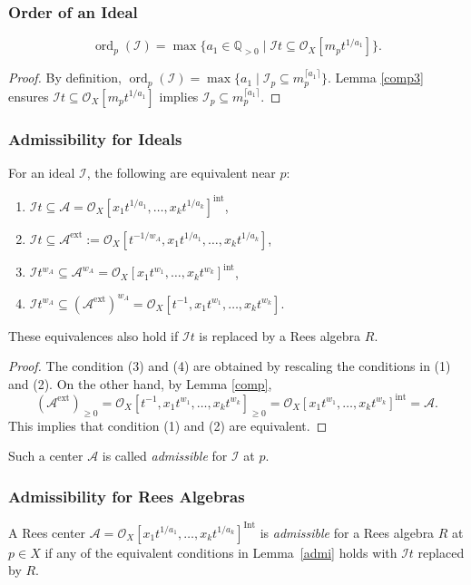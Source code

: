 \documentclass{amsart}
\newcommand{\QQ}{{\mathbb{Q}}}
\newcommand{\cA}{{\mathcal A}}
\newcommand{\cI}{{\mathcal I}}
\newcommand{\cO}{{\mathcal O}}
\newcommand{\Int}{{\operatorname{Int}}}
\newcommand{\ext}{{\operatorname{ext}}}
\newcommand{\ord}{{\operatorname{ord}}}
\newcommand{\inte}{{\operatorname{int}}}
\begin{document}
\subsubsection{Order of an Ideal}
\begin{lemma}\label{order3}
\[ \ord_p(\cI) = \max \{ a_1 \in \QQ_{>0} \mid \cI t \subseteq \cO_X[m_pt^{1/a_1}] \}. \]
\end{lemma}
\begin{proof}
By definition, $\ord_p(\cI) = \max \{ a_1 \mid \cI_p \subseteq m_p^{\lceil a_1 \rceil} \}$. Lemma \ref{comp3} ensures $\cI t \subseteq \cO_X[m_p t^{1/a_1}]$ implies $\cI_p \subseteq m_p^{\lceil a_1 \rceil}$.
\end{proof}

\subsubsection{Admissibility for Ideals}
\begin{lemma}\label{admi}
For an ideal $\cI$, the following are equivalent near $p$:
\begin{enumerate}
  \item $\cI t \subseteq \cA = \cO_X[x_1t^{1/a_1}, \ldots, x_kt^{1/a_k}]^\inte$,
  \item $\cI t \subseteq \cA^\ext := \cO_X[t^{-1/w_A}, x_1t^{1/a_1}, \ldots, x_kt^{1/a_k}]$,
  \item $\cI t^{w_A} \subseteq \cA^{w_A} = \cO_X[x_1t^{w_1}, \ldots, x_kt^{w_k}]^\inte$,
  \item $\cI t^{w_A} \subseteq (\cA^\ext)^{w_A} = \cO_X[t^{-1}, x_1t^{w_1}, \ldots, x_kt^{w_k}]$.
\end{enumerate}
These equivalences also hold if $\cI t$ is replaced by a Rees algebra $R$.
\end{lemma}
\begin{proof} 
 
The condition (3) and (4) are obtained by  rescaling the conditions in (1) and (2). On the other hand, by Lemma \ref{comp}, $$(\cA^{\ext})_{\geq 0}=\cO_X[t^{-1}, x_1t^{w_1},\ldots,x_kt^{w_k}]_{\geq 0}=\cO_X[x_1t^{w_1},\ldots,x_kt^{w_k}]^\inte=\cA.$$
This implies that condition (1) and   (2) are equivalent.
\end{proof}


\begin{definition}
Such a center  $\cA$ is called \emph{admissible} for $\cI$ at $p$.
\end{definition}

\subsubsection{Admissibility for Rees Algebras}
\begin{definition}
A Rees center $\cA = \cO_X[x_1t^{1/a_1}, \ldots, x_kt^{1/a_k}]^\Int$ is \emph{admissible} for a Rees algebra $R$ at $p\in X$ if any of the equivalent conditions in Lemma~\ref{admi} holds with $\cI t$ replaced by  $R$.
\end{definition}
\end{document}
